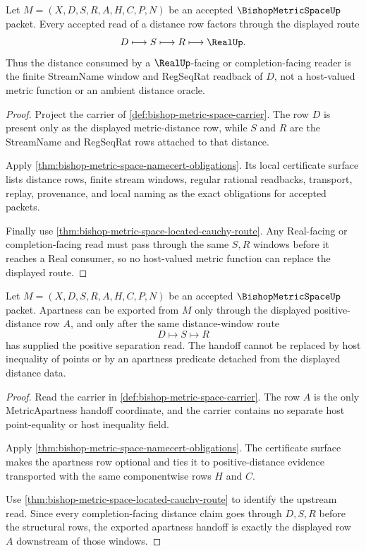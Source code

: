 \begin{theorem}
\label{thm:bishop-metric-space-distance-window-exactness}
Let $M=(X,D,S,R,A,H,C,P,N)$ be an accepted $\BishopMetricSpaceUp$ packet. Every accepted read of a distance row factors through the displayed route
$$
D \longmapsto S \longmapsto R \longmapsto \RealUp .
$$
Thus the distance consumed by a $\RealUp$-facing or completion-facing reader is the finite StreamName window and RegSeqRat readback of $D$, not a host-valued metric function or an ambient distance oracle.
\end{theorem}
\begin{proof}
Project the carrier of \autoref{def:bishop-metric-space-carrier}. The row $D$ is present only as the displayed metric-distance row, while $S$ and $R$ are the StreamName and RegSeqRat rows attached to that distance.

Apply \autoref{thm:bishop-metric-space-namecert-obligations}. Its local certificate surface lists distance rows, finite stream windows, regular rational readbacks, transport, replay, provenance, and local naming as the exact obligations for accepted packets.

Finally use \autoref{thm:bishop-metric-space-located-cauchy-route}. Any Real-facing or completion-facing read must pass through the same $S,R$ windows before it reaches a Real consumer, so no host-valued metric function can replace the displayed route.
\end{proof}

\begin{theorem}
\label{thm:bishop-metric-space-apartness-handoff}
Let $M=(X,D,S,R,A,H,C,P,N)$ be an accepted $\BishopMetricSpaceUp$ packet. Apartness can be exported from $M$ only through the displayed positive-distance row $A$, and only after the same distance-window route
$$
D \longmapsto S \longmapsto R
$$
has supplied the positive separation read. The handoff cannot be replaced by host inequality of points or by an apartness predicate detached from the displayed distance data.
\end{theorem}
\begin{proof}
Read the carrier in \autoref{def:bishop-metric-space-carrier}. The row $A$ is the only MetricApartness handoff coordinate, and the carrier contains no separate host point-equality or host inequality field.

Apply \autoref{thm:bishop-metric-space-namecert-obligations}. The certificate surface makes the apartness row optional and ties it to positive-distance evidence transported with the same componentwise rows $H$ and $C$.

Use \autoref{thm:bishop-metric-space-located-cauchy-route} to identify the upstream read. Since every completion-facing distance claim goes through $D,S,R$ before the structural rows, the exported apartness handoff is exactly the displayed row $A$ downstream of those windows.
\end{proof}

